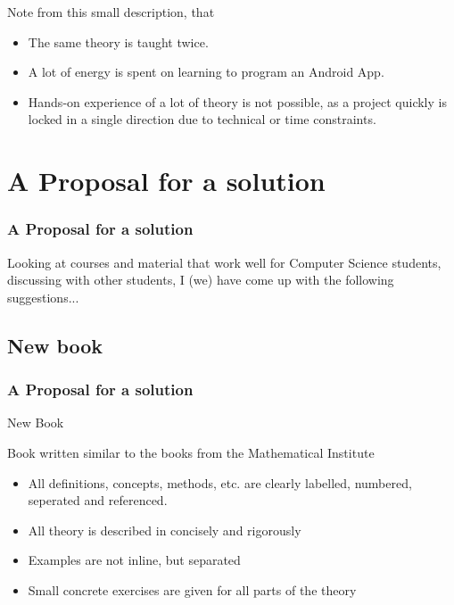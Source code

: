 
\begin{frame}
  Note from this small description, that
  \begin{itemize}
  \item The same theory is taught twice.
  \item A lot of energy is spent on learning to program an Android App.
  \item Hands-on experience of a lot of theory is not possible, as a project
    quickly is locked in a single direction due to technical or time constraints.
  \end{itemize}

\end{frame}

\section{A Proposal for a solution}
\begin{frame}
  \frametitle{A Proposal for a solution}
  Looking at courses and material that work well for Computer Science students,
  discussing with other students, I (we) have come up with the following suggestions...
\end{frame}

\subsection{New book}
\begin{frame}
  \frametitle{A Proposal for a solution}
  \Huge{\centerline{New Book}}
\end{frame}


\begin{frame}
  Book written similar to the books from the Mathematical Institute
  \begin{itemize}
    \item All definitions, concepts, methods, etc. are clearly labelled,
      numbered, seperated and referenced.
    \item All theory is described in concisely and rigorously
    \item Examples are not inline, but separated
    \item Small concrete exercises are given for all parts of the theory
  \end{itemize}
\end{frame}

